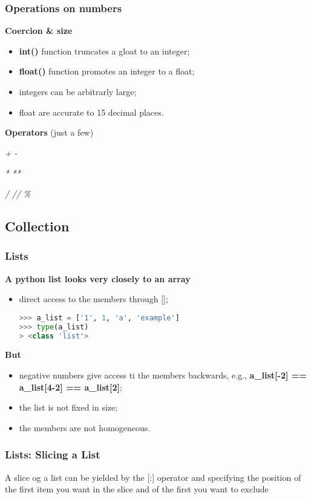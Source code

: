 \subsubsection{Operations on numbers}
\textbf{Coercion \& size}
\begin{itemize}
	\item \textbf{int()} function truncates a gloat to an integer;
	\item \textbf{float()} function promotes an integer to a float;
	\item integers can be arbitrarly large;
	\item float are accurate to 15 decimal places.
\end{itemize}
\textbf{Operators} (just a few)

\textit{+} \textit{-}

\textit{*} \textit{**}

\textit{/} \textit{//} \textit{\%}

\subsection{Collection}

\subsubsection{Lists}
\textbf{A python list looks very closely to an array}
\begin{itemize}
	\item direct access to the members through [];
\begin{lstlisting}[language=Python]
>>> a_list = ['1', 1, 'a', 'example']
>>> type(a_list)
> <class 'list'>
\end{lstlisting}
\end{itemize}
\textbf{But}
\begin{itemize}
	\item negative numbers give access ti the members backwards, e.g., \textbf{a\_list[-2] == a\_list[4-2] == a\_list[2]};
	\item the list is not fixed in size;
	\item the members are not homogeneous.
\end{itemize}

\subsubsection{Lists: Slicing a List}
A slice og a list can be yielded by the [:] operator and specifying the position of the first item you want in the slice and of the first you want to exclude

